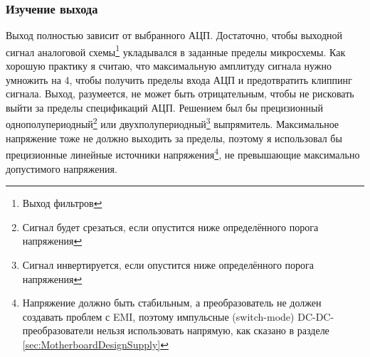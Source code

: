 \documentclass[a4paper, 10pt, final]{article} %
\begin{document}
    \subsubsection{Изучение выхода}\label{sec:SensorboardDesignOutput}
    Выход полностью зависит от выбранного АЦП.
    Достаточно, чтобы выходной сигнал аналоговой схемы\footnote{Выход фильтров} укладывался в заданные пределы микросхемы.
    Как хорошую практику я считаю, что максимальную амплитуду сигнала нужно умножить на 4, чтобы получить пределы входа АЦП и предотвратить клиппинг сигнала.
    Выход, разумеется, не может быть отрицательным, чтобы не рисковать выйти за пределы спецификаций АЦП.
    Решением был бы прецизионный однополупериодный\footnote{Сигнал будет срезаться, если опустится ниже определённого порога напряжения} или двухполупериодный\footnote{Сигнал инвертируется, если опустится ниже определённого порога напряжения} выпрямитель.
    Максимальное напряжение тоже не должно выходить за пределы, поэтому я использовал бы прецизионные линейные источники напряжения\footnote{Напряжение должно быть стабильным, а преобразователь не должен создавать проблем с EMI, поэтому импульсные (switch-mode) DC-DC-преобразователи нельзя использовать напрямую, как сказано в разделе \ref{sec:MotherboardDesignSupply}}, не превышающие максимально допустимого напряжения.
\end{document}
